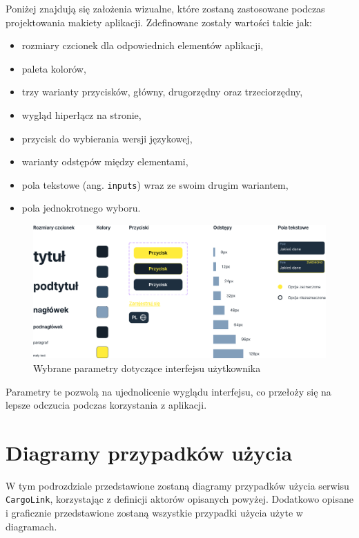 Poniżej znajdują się założenia wizualne, które zostaną zastosowane podczas projektowania makiety aplikacji. Zdefinowane zostały wartości takie jak:
\begin{itemize}
    \item rozmiary czcionek dla odpowiednich elementów aplikacji,
    \item paleta kolorów,
    \item trzy warianty przycisków, główny, drugorzędny oraz trzeciorzędny,
    \item wygląd hiperłącz na stronie,
    \item przycisk do wybierania wersji językowej,
    \item warianty odstępów między elementami,
    \item pola tekstowe (ang. \texttt{inputs}) wraz ze swoim drugim wariantem,
    \item pola jednokrotnego wyboru.
\end{itemize}
\begin{figure}[H]
	\centering
		\includegraphics[width=1\linewidth]{rozdzial1/komponenty.png}
	\caption{Wybrane parametry dotyczące interfejsu użytkownika}
	\label{Rys. fig:Wybrane parametry dotyczące interfejsu użytkownika}
\end{figure}
Parametry te pozwolą na ujednolicenie wyglądu interfejsu, co przełoży się na lepsze odczucia podczas korzystania z aplikacji.

\section{Diagramy przypadków użycia}
W tym podrozdziale przedstawione zostaną diagramy przypadków użycia serwisu \texttt{CargoLink}, korzystając z definicji aktorów opisanych powyżej. Dodatkowo opisane i graficznie przedstawione zostaną wszystkie przypadki użycia użyte w diagramach.
